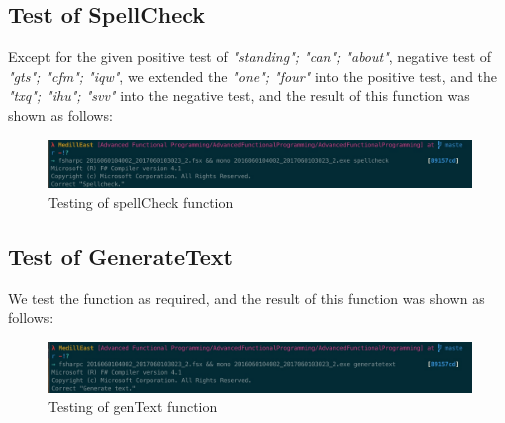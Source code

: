 \documentclass{article}
\begin{document}
\subsection{Test of SpellCheck}

Except for the given positive test of \emph{"standing"; "can"; "about"}, negative test of \emph{"gts"; "cfm"; "iqw"}, we extended the \emph{"one"; "four"} into the positive test, and the \emph{"txq"; "ihu"; "svv"} into the negative test, and the result of this function was shown as follows:

\begin{figure}[htbp]
      \centering
      \includegraphics[width=\linewidth]{spellcheck}
      \caption{Testing of spellCheck function}
      \label{fig:spellcheck}
\end{figure}

\subsection{Test of GenerateText}

We test the function as required, and the result of this function was shown as follows:

\begin{figure}[htbp]
      \centering
      \includegraphics[width=\linewidth]{generatetext}
      \caption{Testing of genText function}
      \label{fig:generatetext}
\end{figure}



\end{document}

